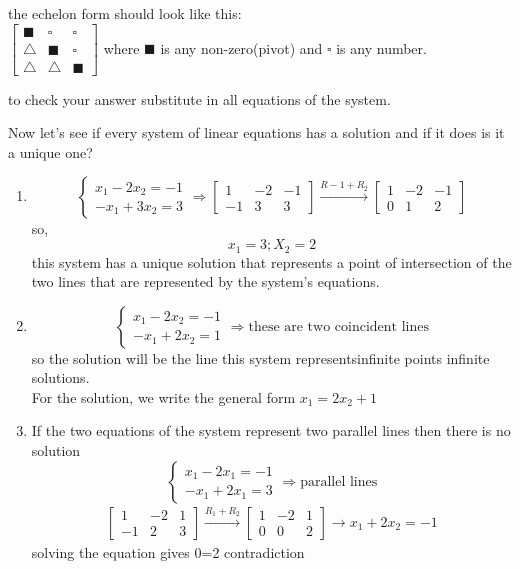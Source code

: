 \documentclass{article}
\begin{document}
\begin{note}
the echelon form should look like this:\\
    $\begin{bmatrix}
        \blacksquare & \square & \square\\
        \triangle & \blacksquare & \square\\
        \triangle & \triangle &   \blacksquare
    \end{bmatrix}$ \textrightarrow where $\blacksquare$ is any non-zero(pivot) and  $\square$ is any number.
\end{note}
\begin{note}
    to check your answer substitute in all equations of the system. 
\end{note}
Now let's see if every system of linear equations has a solution and if it does is it a unique one? 
\begin{enumerate}
\item
    \[
    \begin{cases}
        x_1-2x_2=-1\\-x_1+3x_2=3
    \end{cases}\Rightarrow 
    \begin{bmatrix}
        1&-2&-1\\ -1&3&3
    \end{bmatrix} \xrightarrow{R
    -1+R_2}
    \begin{bmatrix}
        1&-2&-1\\ 0&1&2
    \end{bmatrix}
    \]
so, \[x_1=3 ; X_2=2\]
this system has a unique solution that represents a point of intersection of the two lines that are represented by the system's equations.  
\item
    \[
    \begin{cases}
        x_1-2x_2=-1\\-x_1+2x_2=1
    \end{cases}\Rightarrow \text{these are two coincident lines}
    \]
so the solution will be the line this system represents\textrightarrow infinite points \textrightarrow infinite solutions.\\
For the solution, we write the general form $x_1=2x_2+1$

\item If the two equations of the system represent two parallel lines then there is no solution 
    \[
     \begin{cases}
        x_1-2x_1=-1\\-x_1+2x_1=3
    \end{cases} \Rightarrow \text{parallel lines} 
    \]
\begin{align}
    \begin{bmatrix}
        1&-2&1\\ -1&2&3 
    \end{bmatrix}\xrightarrow{R_1+R_2}
    \begin{bmatrix}
         1&-2&1\\ 0&0&2
    \end{bmatrix} \rightarrow x_1 +2x_2=-1 
\end{align}
solving the equation gives 0=2 \textrightarrow contradiction 
\end{enumerate}
\end{document}
